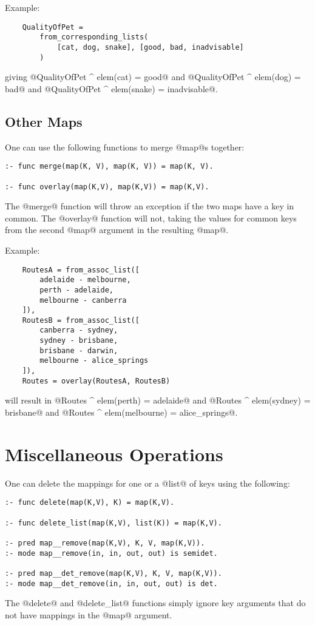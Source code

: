 Example:
\begin{verbatim}
    QualityOfPet =
        from_corresponding_lists(
            [cat, dog, snake], [good, bad, inadvisable]
        )
\end{verbatim}
giving @QualityOfPet ^ elem(cat) = good@ and
@QualityOfPet ^ elem(dog) = bad@ and
@QualityOfPet ^ elem(snake) = inadvisable@.

\subsection{Other Maps}

One can use the following functions to merge @map@s together:
\begin{verbatim}
:- func merge(map(K, V), map(K, V)) = map(K, V).

:- func overlay(map(K,V), map(K,V)) = map(K,V).
\end{verbatim}
The @merge@ function will throw an exception if the two maps have a key
in common.  The @overlay@ function will not, taking the values for
common keys from the second @map@ argument in the resulting @map@.

Example:
\begin{verbatim}
    RoutesA = from_assoc_list([
        adelaide - melbourne,
        perth - adelaide,
        melbourne - canberra
    ]),
    RoutesB = from_assoc_list([
        canberra - sydney,
        sydney - brisbane,
        brisbane - darwin,
        melbourne - alice_springs
    ]),
    Routes = overlay(RoutesA, RoutesB)
\end{verbatim}
will result in @Routes ^ elem(perth) = adelaide@ and
@Routes ^ elem(sydney) = brisbane@ and
@Routes ^ elem(melbourne) = alice_springs@.

\section{Miscellaneous Operations}


One can delete the mappings for one or a @list@ of keys using the
following:
\begin{verbatim}
:- func delete(map(K,V), K) = map(K,V).

:- func delete_list(map(K,V), list(K)) = map(K,V).

:- pred map__remove(map(K,V), K, V, map(K,V)).
:- mode map__remove(in, in, out, out) is semidet.

:- pred map__det_remove(map(K,V), K, V, map(K,V)).
:- mode map__det_remove(in, in, out, out) is det.
\end{verbatim}
The @delete@ and @delete_list@ functions simply ignore key arguments
that do not have mappings in the @map@ argument.

